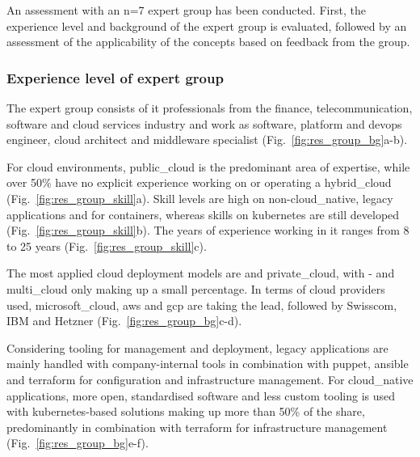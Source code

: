 \documentclass[../main.tex]{subfiles}
\begin{document}
    An assessment with an n=7 expert group has been conducted.
    First, the experience level and background of the expert group is evaluated, followed by an assessment of the applicability of the concepts based on feedback from the group.

    \subsubsection{Experience level of expert group}

    The expert group consists of \acrshort{it} professionals from the finance, telecommunication, software and \gls{cloud} services industry and work as software, platform and \gls{devops} engineer, \gls{cloud} architect and middleware specialist (Fig.~\ref{fig:res_group_bg}a-b).

    For \gls{cloud} environments, \gls{public_cloud} is the predominant area of expertise, while over 50\% have no explicit experience working on or operating a \gls{hybrid_cloud} (Fig.~\ref{fig:res_group_skill}a).
    Skill levels are high on non-\gls{cloud_native}, legacy applications and for containers, whereas skills on \gls{kubernetes} are still developed (Fig.~\ref{fig:res_group_skill}b).
    The years of experience working in \acrshort{it} ranges from 8 to 25 years (Fig.~\ref{fig:res_group_skill}c).

    The most applied \gls{cloud} deployment models are  and \gls{private_cloud}, with - and \gls{multi_cloud} only making up a small percentage.
    In terms of \gls{cloud} providers used, \gls{microsoft_cloud}, \acrlong{aws} and \acrlong{gcp} are taking the lead, followed by Swisscom, IBM and Hetzner (Fig.~\ref{fig:res_group_bg}c-d).

    Considering tooling for management and deployment, legacy applications are mainly handled with company-internal tools in combination with \gls{puppet}, \gls{ansible} and \gls{terraform} for configuration and infrastructure management.
    For \gls{cloud_native} applications, more open, standardised software and less custom tooling is used with \gls{kubernetes}-based solutions making up more than 50\% of the share, predominantly in combination with \gls{terraform} for infrastructure management (Fig.~\ref{fig:res_group_bg}e-f).

    

    

    \clearpage
\end{document}
